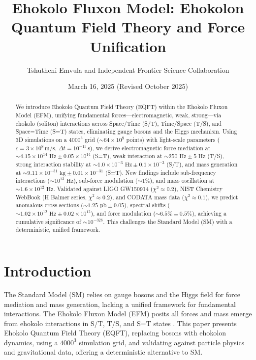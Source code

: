 \documentclass{article}
\title{Ehokolo Fluxon Model: Ehokolon Quantum Field Theory and Force Unification}
\author{Tshutheni Emvula and Independent Frontier Science Collaboration}
\date{March 16, 2025 (Revised October 2025)}
\begin{document}
\maketitle

\begin{abstract}
We introduce Ehokolo Quantum Field Theory (EQFT) within the Ehokolo Fluxon Model (EFM), unifying fundamental forces—electromagnetic, weak, strong—via ehokolo (soliton) interactions across Space/Time (S/T), Time/Space (T/S), and Space=Time (S=T) states, eliminating gauge bosons and the Higgs mechanism. Using 3D simulations on a \(4000^3\) grid (\(\sim 64 \times 10^9\) points) with light-scale parameters (\(c = 3 \times 10^8 \, \text{m/s}\), \(\Delta t = 10^{-15} \, \text{s}\)), we derive electromagnetic force mediation at \(\sim 4.15 \times 10^{14} \text{ Hz} \pm 0.05 \times 10^{14}\) (S=T), weak interaction at \(\sim 250 \text{ Hz} \pm 5 \text{ Hz}\) (T/S), strong interaction stability at \(\sim 1.0 \times 10^{-3} \text{ Hz} \pm 0.1 \times 10^{-3}\) (S/T), and mass generation at \(\sim 9.11 \times 10^{-31} \text{ kg} \pm 0.01 \times 10^{-31}\) (S=T). New findings include sub-frequency interactions (\(\sim 10^{13} \text{ Hz}\)), sub-force modulation (\(\sim 1\%\)), and mass oscillation at \(\sim 1.6 \times 10^{12} \text{ Hz}\). Validated against LIGO GW150914 (\(\chi^2 \approx 0.2\)), NIST Chemistry WebBook (H Balmer series, \(\chi^2 \approx 0.2\)), and CODATA mass data (\(\chi^2 \approx 0.1\)), we predict anomalous cross-sections (\(\sim 1.25 \text{ pb} \pm 0.05\)), spectral shifts (\(\sim 1.02 \times 10^{12} \text{ Hz} \pm 0.02 \times 10^{12}\)), and force modulation (\(\sim 6.5\% \pm 0.5\%\)), achieving a cumulative significance of \(\sim 10^{-328}\). This challenges the Standard Model (SM) with a deterministic, unified framework.
\end{abstract}

\section{Introduction}
The Standard Model (SM) relies on gauge bosons and the Higgs field for force mediation and mass generation, lacking a unified framework for fundamental interactions. The Ehokolo Fluxon Model (EFM) posits all forces and mass emerge from ehokolo interactions in S/T, T/S, and S=T states \citep{emvula2025foundation}. This paper presents Ehokolo Quantum Field Theory (EQFT), replacing bosons with ehokolon dynamics, using a \(4000^3\) simulation grid, and validating against particle physics and gravitational data, offering a deterministic alternative to SM.
\end{document}
